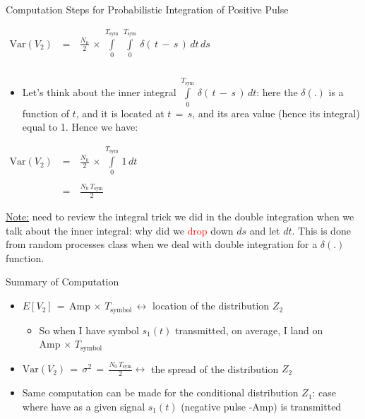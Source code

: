 \documentclass{Beamer}
\begin{document}
\begin{frame}[t,allowframebreaks]{Computation Steps for Probabilistic Integration of Positive Pulse}
\begin{enumerate}
$\begin{array}{rcl}
\text{Var}(V_2) \,&=& \, \displaystyle\frac{N_0}{2} \, \times \,  \displaystyle\int\limits_{0}^{T_{\text{sym}}} \, \displaystyle\int\limits_{0}^{T_{\text{sym}}} \, \delta(\, t \, - \, s \,) \, dt \, ds \\ \\
\end{array}$

	\begin{itemize}
	\item Let's think about the inner integral $\displaystyle\int\limits_{0}^{T_{\text{sym}}} \, \delta(\, t \, - \, s \,) \, dt$: here the $\delta(.)$ is a function of $t$, and it is located at $t \, = \, s$, and its area value (hence its  integral) equal to 1. Hence we have:
	\end{itemize}


$\begin{array}{rcl}
\text{Var}(V_2) \,&=& \, \displaystyle\frac{N_0}{2} \, \times \,  \displaystyle\int\limits_{0}^{T_{\text{sym}}} \, 1 \, dt \\ \\
&=& \, \displaystyle\frac{N_0 \, T_{\text{sym}}}{2}
\end{array}$

\newpage
\underline{Note:} need to review the integral trick we did in the double integration when we talk about the inner integral: why did we \textcolor{red}{drop} down $ds$ and let $dt$. This is done from random processes class when we deal with double integration for a $\delta(.)$ function.

\end{enumerate}

\end{frame}

\begin{frame}[t]{Summary of Computation}

\begin{itemize}

\item $E[V_2] \, = \,  \text{Amp}\, \times \, T_{\text{symbol}} \, \leftrightarrow$ location of the distribution $Z_2$

	\begin{itemize}
	\item So when I have symbol $s_1(t)$ transmitted, on average, I land on $  \text{Amp}\, \times \, T_{\text{symbol}}$
\end{itemize}	 

\item  $ \text{Var}(V_2) \, = \, \sigma^2 \, = \, \displaystyle\frac{N_0 \, T_{\text{sym}}}{2} \leftrightarrow$ the spread of the distribution $Z_2$

\item Same computation can be made for the conditional distribution $Z_1$: case where have as a given signal $s_1(t)$ (negative pulse -Amp) is transmitted

\end{itemize}


\end{frame}
\end{document}
